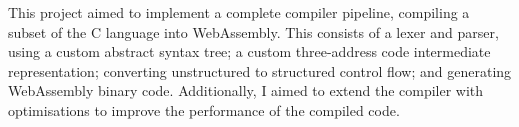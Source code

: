 \documentclass[00-main.tex]{subfiles}
\begin{document}
This project aimed to implement a complete compiler pipeline, compiling a subset of the C language into WebAssembly.
This consists of a lexer and parser, using a custom abstract syntax tree; a custom three-address code intermediate representation; converting unstructured to structured control flow; and generating WebAssembly binary code.
Additionally, I aimed to extend the compiler with optimisations to improve the performance of the compiled code.
\end{document}
